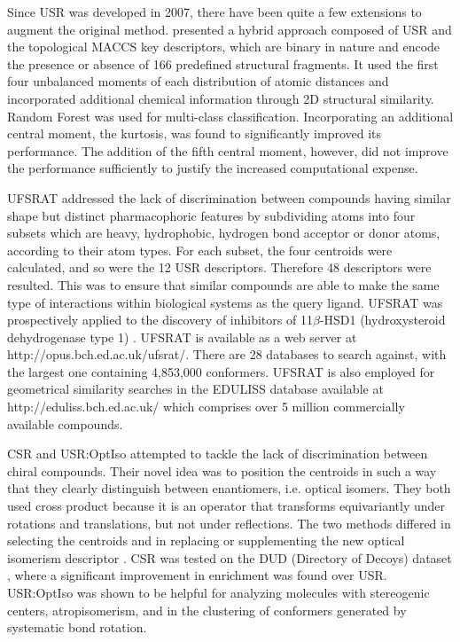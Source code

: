 Since USR was developed in 2007, there have been quite a few extensions \citep{1333,1436,1437,1334,1335,1337,1338,1331,1407,1408} to augment the original method. \citep{1333} presented a hybrid approach composed of USR and the topological MACCS key descriptors, which are binary in nature and encode the presence or absence of 166 predefined structural fragments. It used the first four unbalanced moments of each distribution of atomic distances and incorporated additional chemical information through 2D structural similarity. Random Forest \citep{1309} was used for multi-class classification. Incorporating an additional central moment, the kurtosis, was found to significantly improved its performance. The addition of the fifth central moment, however, did not improve the performance sufficiently to justify the increased computational expense.

UFSRAT \citep{1436} addressed the lack of discrimination between compounds having similar shape but distinct pharmacophoric features by subdividing atoms into four subsets which are heavy, hydrophobic, hydrogen bond acceptor or donor atoms, according to their atom types. For each subset, the four centroids were calculated, and so were the 12 USR descriptors. Therefore 48 descriptors were resulted. This was to ensure that similar compounds are able to make the same type of interactions within biological systems as the query ligand. UFSRAT was prospectively applied to the discovery of inhibitors of 11$\beta$-HSD1 (hydroxysteroid dehydrogenase type 1) \citep{1505}. UFSRAT is available as a web server at http://opus.bch.ed.ac.uk/ufsrat/. There are 28 databases to search against, with the largest one containing 4,853,000 conformers. UFSRAT is also employed for geometrical similarity searches in the EDULISS database \citep{1437} available at http://eduliss.bch.ed.ac.uk/ which comprises over 5 million commercially available compounds.

CSR \citep{1334} and USR:OptIso \citep{1335} attempted to tackle the lack of discrimination between chiral compounds. Their novel idea was to position the centroids in such a way that they clearly distinguish between enantiomers, i.e. optical isomers. They both used cross product because it is an operator that transforms equivariantly under rotations and translations, but not under reflections. The two methods differed in selecting the centroids and in replacing or supplementing the new optical isomerism descriptor \citep{1335}. CSR \citep{1334} was tested on the DUD (Directory of Decoys) dataset \citep{87}, where a significant improvement in enrichment was found over USR. USR:OptIso \citep{1335} was shown to be helpful for analyzing molecules with stereogenic centers, atropisomerism, and in the clustering of conformers generated by systematic bond rotation.

